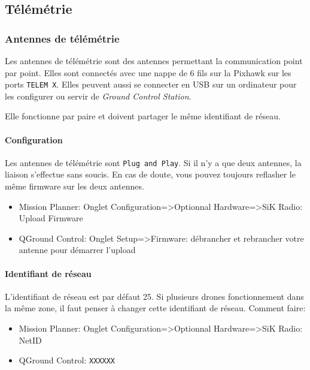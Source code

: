 \documentclass[a4paper, 10pt]{report}
\begin{document}
\subsection{Télémétrie}
\subsubsection{Antennes de télémétrie}
Les antennes de télémétrie sont des antennes permettant la communication point par point.
Elles sont connectés avec une nappe de 6 fils sur la Pixhawk sur les ports \texttt{TELEM X}.
Elles peuvent aussi se connecter en USB sur un ordinateur pour les configurer ou servir de \textit{Ground Control Station}.

 Elle fonctionne par paire et doivent partager le même identifiant de réseau.
 
\paragraph{Configuration}
Les antennes de télémétrie sont \texttt{Plug and Play}. Si il n'y a que deux antennes, la liaison s'effectue sans soucis. En cas de doute, vous pouvez toujours reflasher le même firmware sur les deux antennes.
\begin{itemize}
	\item Mission Planner: Onglet Configuration=>Optionnal Hardware=>SiK Radio: Upload Firmware
	\item QGround Control: Onglet Setup=>Firmware: débrancher et rebrancher votre antenne pour démarrer l'upload
\end{itemize}
\paragraph{Identifiant de réseau} L'identifiant de réseau est par défaut 25. Si plusieurs drones fonctionnement dans la même zone, il faut penser à changer cette identifiant de réseau. Comment faire:
\begin{itemize}
	\item Mission Planner: Onglet Configuration=>Optionnal Hardware=>SiK Radio: NetID
	\item QGround Control: \texttt{XXXXXX}
\end{itemize}
\end{document}
